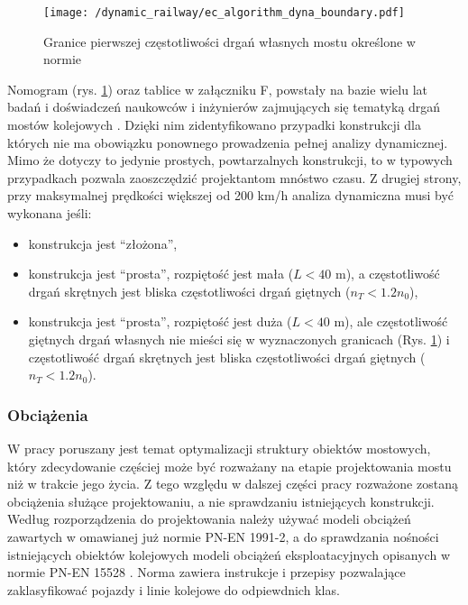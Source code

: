 \begin{figure}[h]
	\centering
	\texttt{[image: /dynamic\_railway/ec\_algorithm\_dyna\_boundary.pdf]} 
	\captionsetup{justification=centering}
	\caption{Granice pierwszej częstotliwości drgań własnych mostu określone w normie \cite{PKNj}}
	\label{fig:ec_algorithm_dyna_boundary}
\end{figure}

Nomogram (rys. \ref{fig:ec_algorithm_dyna_boundary}) oraz tablice w załączniku F, powstały na bazie wielu lat badań i doświadczeń naukowców i inżynierów zajmujących się tematyką drgań mostów kolejowych \parencite{UnionInternationaleDesCheminsDeFer2009,ERRI1998}. Dzięki nim zidentyfikowano przypadki konstrukcji dla których nie ma obowiązku ponownego prowadzenia pełnej analizy dynamicznej. Mimo że dotyczy to jedynie prostych, powtarzalnych konstrukcji, to w typowych przypadkach pozwala zaoszczędzić projektantom mnóstwo czasu. Z drugiej strony, przy maksymalnej prędkości większej od 200 km/h analiza dynamiczna musi być wykonana jeśli:
\begin{itemize}[noitemsep]
	\item konstrukcja jest \enquote{złożona},
	\item konstrukcja jest \enquote{prosta}, rozpiętość jest mała ($L < 40$ m), a częstotliwość drgań skrętnych jest bliska częstotliwości drgań giętnych ($n_T<1.2n_0$),
	\item konstrukcja jest \enquote{prosta}, rozpiętość jest duża ($L < 40$ m), ale częstotliwość giętnych drgań własnych nie mieści się w wyznaczonych granicach (Rys. \ref{fig:ec_algorithm_dyna_boundary}) i częstotliwość drgań skrętnych jest bliska częstotliwości drgań giętnych ($n_T<1.2n_0$).
\end{itemize}




\subsubsection{Obciążenia} \label{sect: eurokod_obciazenia_dyn}
W pracy poruszany jest temat optymalizacji struktury obiektów mostowych, który zdecydowanie częściej może być rozważany na etapie projektowania mostu niż w trakcie jego życia. Z tego względu w dalszej części pracy rozważone zostaną obciążenia służące projektowaniu, a nie sprawdzaniu istniejących konstrukcji. Według rozporządzenia \parencite{PolskiKomitetNormalizacyjny} do projektowania należy używać modeli obciążeń zawartych w omawianej już normie PN-EN 1991-2, a do sprawdzania nośności istniejących obiektów kolejowych modeli obciążeń eksploatacyjnych opisanych w normie PN-EN 15528 \parencite{PolskiKomitetNormalizacyjnya,uszczki2015}. Norma \cite{PolskiKomitetNormalizacyjnya} zawiera instrukcje i przepisy pozwalające zaklasyfikować pojazdy i linie kolejowe do odpiewdnich klas.

